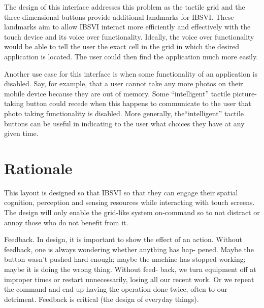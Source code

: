 \documentclass[11pt]{article}
\begin{document}
The design of this interface addresses this problem as the tactile grid and the three-dimensional buttons provide additional landmarks for IBSVI. These landmarks aim to allow IBSVI interact more efficiently and effectively with the touch device and its voice over functionality. Ideally, the voice over functionality would be able to tell the user the exact cell in the grid in which the desired application is located. The user could then find the application much more easily.

Another use case for this interface is when some functionality of an application is disabled. Say, for example, that a user cannot take any more photos on their mobile device because they are out of memory. Some ``intelligent'' tactile picture-taking button could recede when this happens to communicate to the user that photo taking functionality is disabled. More generally, the``intelligent'' tactile buttons can be useful in indicating to the user what choices they have at any given time.

\section{Rationale}
This layout is designed so that IBSVI so that they can engage their spatial cognition, perception and sensing resources while interacting with touch screens. The design will only enable the grid-like system on-command so to not distract or annoy those who do not benefit from it.

Feedback. In design, it is important to show the effect of an action. Without feedback, one is always wondering whether anything has hap- pened. Maybe the button wasn't pushed hard enough; maybe the machine has stopped working; maybe it is doing the wrong thing. Without feed- back, we turn equipment off at improper times or restart unnecessarily, losing all our recent work. Or we repeat the command and end up having the operation done twice, often to our detriment. Feedback is critical (the design of everyday things).
\end{document}
